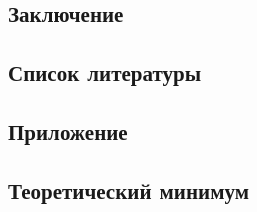 \documentclass{article}
\begin{document}
    \newpage
    \begin{center} 
    \section{Заключение}
    \end{center}
    
    
    \newpage
    \begin{center} 
    \section{Список литературы}
    \end{center}
    
    \newpage
    \begin{center} 
    \section{Приложение}
    \end{center}
    
    
    \newpage
    \begin{center} 
    \section{Теоретический минимум}
    \end{center}
    
    
\end{document}
